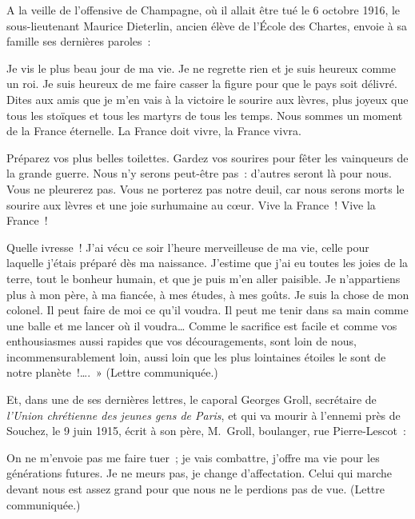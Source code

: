 \documentclass[french,twoside]{book} %
\newenvironment{quoteblock}%
  {\begin{quoting}}
  {\end{quoting}}
\newenvironment{quotebar}{%
    \def\FrameCommand{{\color{rubric!10!}\vrule width 0.5em} \hspace{0.9em}}%
    \def\OuterFrameSep{\itemsep} %
    \MakeFramed {\advance\hsize-\width \FrameRestore}
  }%
  {%
    \endMakeFramed
  }
\renewenvironment{quoteblock}%
  {%
    \savenotes
    \setstretch{0.9}
    \normalfont
    \begin{quotebar}
  }
  {%
    \end{quotebar}
    \spewnotes
  }
\begin{document}
\noindent A la veille de l’offensive de Champagne, où il allait être tué le 6 octobre 1916, le sous-lieutenant Maurice Dieterlin, ancien élève de l’École des Chartes, envoie à sa famille ses dernières paroles :‌\par

\begin{quoteblock}
 \noindent Je vis le plus beau jour de ma vie. Je ne regrette rien et je suis heureux comme un roi. Je suis heureux de me faire casser la figure pour que le pays soit délivré. Dites aux amis que je m’en vais à la victoire le sourire aux lèvres, plus joyeux que tous les stoïques et tous les martyrs de tous les temps. Nous sommes un moment de la France éternelle. La France doit vivre, la France vivra.‌\par
 Préparez vos plus belles toilettes. Gardez vos sourires pour fêter les vainqueurs de la grande guerre. Nous n’y serons peut-être pas : d’autres seront là pour nous. Vous ne pleurerez pas. Vous ne porterez pas notre deuil, car nous serons morts le sourire aux lèvres et une joie surhumaine au cœur. Vive la France ! Vive la France !‌\par
 Quelle ivresse ! J’ai vécu ce soir l’heure merveilleuse de ma vie, celle pour laquelle j’étais préparé dès ma naissance. J’estime que j’ai eu toutes les joies de la terre, tout le bonheur humain, et que je puis m’en aller paisible. Je n’appartiens plus à mon père, à ma fiancée, à mes études, à mes goûts. Je suis la chose de mon colonel. Il peut faire de moi ce qu’il voudra. Il peut me tenir dans sa main comme une balle et me lancer où il voudra… Comme le sacrifice est facile et comme vos enthousiasmes aussi rapides que vos découragements, sont loin de nous, incommensurablement loin, aussi loin que les plus lointaines étoiles le sont de notre planète !…. » (Lettre communiquée.)‌
 \end{quoteblock}

\noindent Et, dans une de ses dernières lettres, le caporal Georges Groll, secrétaire de {\itshape l’Union chrétienne des jeunes gens de Paris}, et qui va mourir à l’ennemi près de Souchez, le 9 juin 1915, écrit à son père, M. Groll, boulanger, rue Pierre-Lescot :‌\par

\begin{quoteblock}
 \noindent On ne m’envoie pas me faire tuer ; je vais combattre, j’offre ma vie pour les générations futures. Je ne meurs pas, je change d’affectation. Celui qui marche devant nous est assez grand pour que nous ne le perdions pas de vue. (Lettre communiquée.)‌
 \end{quoteblock}
\end{document}
